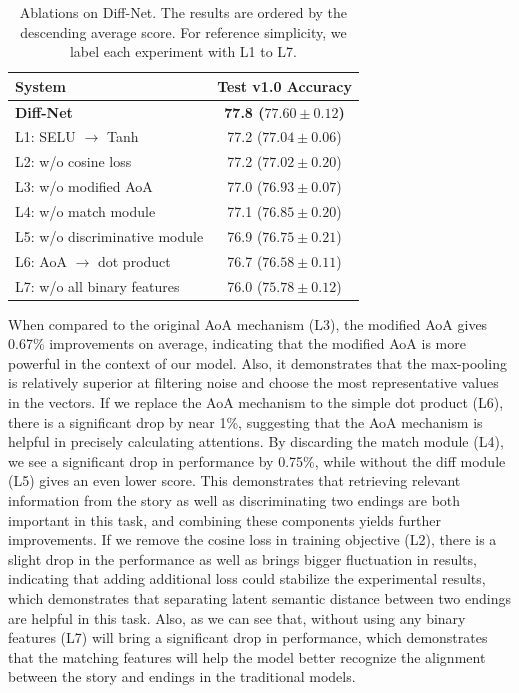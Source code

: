 \documentclass[letterpaper]{article} %
\begin{document}
\begin{table}[htbp]
\small
\begin{center}
\begin{tabular}{p{4cm} c}
\toprule
{\bf System} 					& {\bf Test v1.0 Accuracy} \\
\midrule
\bf Diff-Net 					& \bf 77.8 ($77.60 \pm 0.12$) \\
L1: SELU $\rightarrow$ Tanh 		& 77.2 ($77.04 \pm 0.06$) \\
L2: w/o cosine loss				& 77.2 ($77.02 \pm 0.20$) \\
L3: w/o modified AoA 			& 77.0 ($76.93 \pm 0.07$) \\
L4: w/o match module 			& 77.1 ($76.85 \pm 0.20$) \\
L5: w/o discriminative module 		& 76.9 ($76.75 \pm 0.21$) \\
L6: AoA $\rightarrow$ dot product	& 76.7 ($76.58 \pm 0.11$) \\
L7: w/o all binary features 		& 76.0 ($75.78 \pm 0.12$) \\
\bottomrule
\end{tabular}
\end{center}
\caption{\label{ablation-general} Ablations on Diff-Net. The results are ordered by the descending average score. For reference simplicity, we label each experiment with L1 to L7.}
\end{table}

When compared to the original AoA mechanism (L3), the modified AoA gives 0.67\% improvements on average, indicating that the modified AoA is more powerful in the context of our model. Also, it demonstrates that the max-pooling is relatively superior at filtering noise and choose the most representative values in the vectors. If we replace the AoA mechanism to the simple dot product (L6), there is a significant drop by near 1\%, suggesting that the AoA mechanism is helpful in precisely calculating attentions.
By discarding the match module (L4), we see a significant drop in performance by 0.75\%, while without the diff module (L5) gives an even lower score.
This demonstrates that retrieving relevant information from the story as well as discriminating two endings are both important in this task, and combining these components yields further improvements.
If we remove the cosine loss in training objective (L2), there is a slight drop in the performance as well as brings bigger fluctuation in results, indicating that adding additional loss could stabilize the experimental results, which demonstrates that separating latent semantic distance between two endings are helpful in this task.
Also, as we can see that, without using any binary features (L7) will bring a significant drop in performance, which demonstrates that the matching features will help the model better recognize the alignment between the story and endings in the traditional models.
\end{document}
